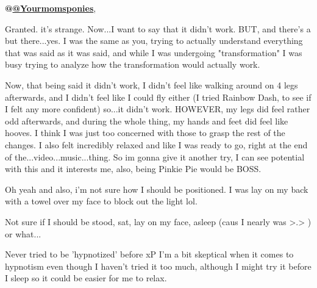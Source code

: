 \documentclass[ebook,12pt,oneside,openany]{memoir}
\begin{document}
\begin{tcolorbox}[title=Agent505,colback=pink!5!white,colframe=pink!75!black,coltitle=white]
\par{\textbf{@}\textbf{\href{https://mlpforums.com/profile/10550-yourmomsponies/}{@Yourmomsponies}}, }
\newline{}
\par{Granted. it's strange. Now...I want to say that it didn't work. BUT, and there's a but there...yes. I was the same as you, trying to actually understand everything that was said as it was said, and while I was undergoing "transformation" I was busy trying to analyze how the transformation would actually work. }
\newline{}
\par{Now, that being said it didn't work, I didn't feel like walking around on 4 legs afterwards, and I didn't feel like I could fly either (I tried Rainbow Dash, to see if I felt any more confident) so...it didn't work. HOWEVER, my legs did feel rather odd afterwards, and during the whole thing, my hands and feet did feel like hooves. I think I was just too concerned with those to grasp the rest of the changes. I also felt incredibly relaxed and like I was ready to go, right at the end of the...video...music...thing. So im gonna give it another try, I can see potential with this and it interests me, also, being Pinkie Pie would be BOSS.}
\newline{}
\newline{}
\par{Oh yeah and also, i'm not sure how I should be positioned. I was lay on my back with a towel over my face to block out the light lol. }
\par{Not sure if I should be stood, sat, lay on my face, asleep (caus I nearly was >.> ) or what...}
\end{tcolorbox}
\begin{tcolorbox}[title=Rainbow Dash Loyalty]
\par{Never tried to be 'hypnotized' before xP I'm a bit skeptical when it comes to hypnotism even though I haven't tried it too much, although I might try it before I sleep so it could be easier for me to relax.}
\end{tcolorbox}
\end{document}
